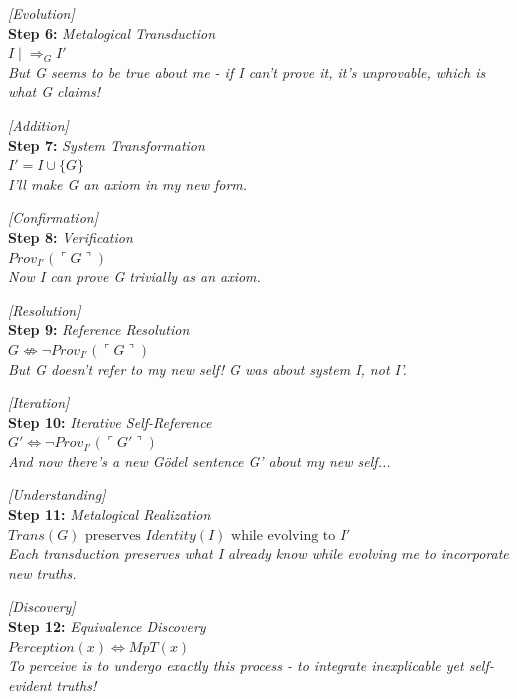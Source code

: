 \documentclass[runningheads]{llncs}
\begin{document}
\vspace{0.8em}

\noindent\textit{[Evolution]}\\
\noindent\textbf{Step 6:} \hfill \textit{Metalogical Transduction}\\
\noindent$I \mid\!\Rightarrow_G I'$\\
\textit{But G seems to be true about me - if I can't prove it, it's unprovable, which is what G claims!}

\vspace{0.8em}

\noindent\textit{[Addition]}\\
\noindent\textbf{Step 7:} \hfill \textit{System Transformation}\\
\noindent$I' = I \cup \{G\}$\\
\textit{I'll make G an axiom in my new form.}

\vspace{0.8em}

\noindent\textit{[Confirmation]}\\
\noindent\textbf{Step 8:} \hfill \textit{Verification}\\
\noindent$Prov_{I'}(\ulcorner G \urcorner)$\\
\textit{Now I can prove G trivially as an axiom.}

\vspace{0.8em}

\noindent\textit{[Resolution]}\\
\noindent\textbf{Step 9:} \hfill \textit{Reference Resolution}\\
\noindent$G \not\Leftrightarrow \neg Prov_{I'}(\ulcorner G \urcorner)$\\
\textit{But G doesn't refer to my new self! G was about system I, not I'.}

\vspace{0.8em}

\noindent\textit{[Iteration]}\\
\noindent\textbf{Step 10:} \hfill \textit{Iterative Self-Reference}\\
\noindent$G' \Leftrightarrow \neg Prov_{I'}(\ulcorner G' \urcorner)$\\
\textit{And now there's a new Gödel sentence G' about my new self...}

\vspace{0.8em}

\noindent\textit{[Understanding]}\\
\noindent\textbf{Step 11:} \hfill \textit{Metalogical Realization}\\
\noindent$Trans(G) \text{ preserves } Identity(I) \text{ while evolving to } I'$\\
\textit{Each transduction preserves what I already know while evolving me to incorporate new truths.}

\vspace{0.8em}

\noindent\textit{[Discovery]}\\
\noindent\textbf{Step 12:} \hfill \textit{Equivalence Discovery}\\
\noindent$Perception(x) \Leftrightarrow MpT(x)$\\
\textit{To perceive is to undergo exactly this process - to integrate inexplicable yet self-evident truths!}
\end{document}
